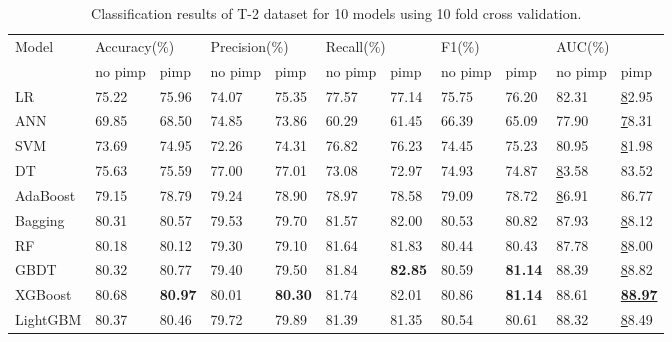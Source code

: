 \documentclass[review]{elsarticle}
\begin{document}
\begin{table}[H]\footnotesize
    \centering
    \caption{Classification results of T-2 dataset for 10 models using 10 fold cross validation.}
    \label{Classification results 2}
    \begin{tabular}{lllllllllll}
    \hline
    \multirow{2}{*}{Model} & \multicolumn{2}{l}{Accuracy(\%)} & \multicolumn{2}{l}{Precision(\%)} & \multicolumn{2}{l}{Recall(\%)} & \multicolumn{2}{l}{F1(\%)} & \multicolumn{2}{l}{AUC(\%)} \\ \cline{2-11}
     & no pimp & pimp & no pimp & pimp & no pimp & pimp & no pimp & pimp & no pimp & pimp \\ \hline
    LR & 75.22 & 75.96 & 74.07 & 75.35 & 77.57 & 77.14 & 75.75 & 76.20 & 82.31 & {\ul 82.95} \\
    ANN & 69.85 & 68.50 & 74.85 & 73.86 & 60.29 & 61.45 & 66.39 & 65.09 & 77.90 & {\ul 78.31} \\
    SVM & 73.69 & 74.95 & 72.26 & 74.31 & 76.82 & 76.23 & 74.45 & 75.23 & 80.95 & {\ul 81.98} \\
    DT & 75.63 & 75.59 & 77.00 & 77.01 & 73.08 & 72.97 & 74.93 & 74.87 & {\ul 83.58} & 83.52 \\
    AdaBoost & 79.15 & 78.79 & 79.24 & 78.90 & 78.97 & 78.58 & 79.09 & 78.72 & {\ul 86.91} & 86.77 \\
    Bagging & 80.31 & 80.57 & 79.53 & 79.70 & 81.57 & 82.00 & 80.53 & 80.82 & 87.93 & {\ul 88.12} \\
    RF & 80.18 & 80.12 & 79.30 & 79.10 & 81.64 & 81.83 & 80.44 & 80.43 & 87.78 & {\ul 88.00} \\
    GBDT & 80.32 & 80.77 & 79.40 & 79.50 & 81.84 & \textbf{82.85} & 80.59 & \textbf{81.14} & 88.39 & {\ul 88.82} \\
    XGBoost & 80.68 & \textbf{80.97} & 80.01 & \textbf{80.30} & 81.74 & 82.01 & 80.86 & \textbf{81.14} & 88.61 & {\ul \textbf{88.97}} \\
    LightGBM & 80.37 & 80.46 & 79.72 & 79.89 & 81.39 & 81.35 & 80.54 & 80.61 & 88.32 & {\ul 88.49} \\ \hline
    \end{tabular}
\end{table}
\end{document}
